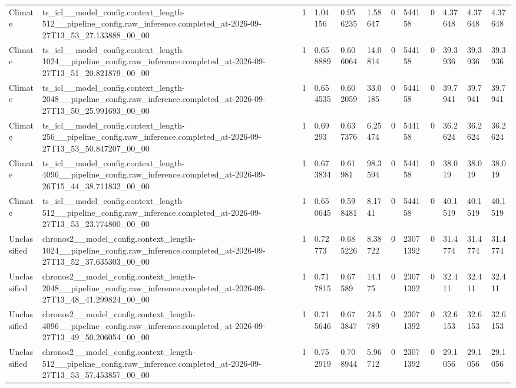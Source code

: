 \begin{tabular}{llllllllllll}
Climate & ts\_icl\_\_model\_config.context\_length-512\_\_pipeline\_config.raw\_inference.completed\_at-2026-09-27T13\_53\_27.133888\_00\_00 & 1 & 1.04156 & 0.956235 & 1.58647 & 0 & 544158 & 0 & 4.37648 & 4.37648 & 4.37648 \\
Climate & ts\_icl\_\_model\_config.context\_length-1024\_\_pipeline\_config.raw\_inference.completed\_at-2026-09-27T13\_51\_20.821879\_00\_00 & 1 & 0.658889 & 0.606064 & 14.0814 & 0 & 544158 & 0 & 39.3936 & 39.3936 & 39.3936 \\
Climate & ts\_icl\_\_model\_config.context\_length-2048\_\_pipeline\_config.raw\_inference.completed\_at-2026-09-27T13\_50\_25.991693\_00\_00 & 1 & 0.654535 & 0.602059 & 33.0185 & 0 & 544158 & 0 & 39.7941 & 39.7941 & 39.7941 \\
Climate & ts\_icl\_\_model\_config.context\_length-256\_\_pipeline\_config.raw\_inference.completed\_at-2026-09-27T13\_53\_50.847207\_00\_00 & 1 & 0.69293 & 0.637376 & 6.25474 & 0 & 544158 & 0 & 36.2624 & 36.2624 & 36.2624 \\
Climate & ts\_icl\_\_model\_config.context\_length-4096\_\_pipeline\_config.raw\_inference.completed\_at-2026-09-26T15\_44\_38.711832\_00\_00 & 1 & 0.673834 & 0.61981 & 98.3594 & 0 & 544158 & 0 & 38.019 & 38.019 & 38.019 \\
Climate & ts\_icl\_\_model\_config.context\_length-512\_\_pipeline\_config.raw\_inference.completed\_at-2026-09-27T13\_53\_23.774800\_00\_00 & 1 & 0.650645 & 0.598481 & 8.1741 & 0 & 544158 & 0 & 40.1519 & 40.1519 & 40.1519 \\
Unclassified & chronos2\_\_model\_config.context\_length-1024\_\_pipeline\_config.raw\_inference.completed\_at-2026-09-27T13\_52\_37.635303\_00\_00 & 1 & 0.72773 & 0.685226 & 8.38722 & 0 & 23071392 & 0 & 31.4774 & 31.4774 & 31.4774 \\
Unclassified & chronos2\_\_model\_config.context\_length-2048\_\_pipeline\_config.raw\_inference.completed\_at-2026-09-27T13\_48\_41.299824\_00\_00 & 1 & 0.717815 & 0.67589 & 14.175 & 0 & 23071392 & 0 & 32.411 & 32.411 & 32.411 \\
Unclassified & chronos2\_\_model\_config.context\_length-4096\_\_pipeline\_config.raw\_inference.completed\_at-2026-09-27T13\_49\_50.206054\_00\_00 & 1 & 0.715646 & 0.673847 & 24.5789 & 0 & 23071392 & 0 & 32.6153 & 32.6153 & 32.6153 \\
Unclassified & chronos2\_\_model\_config.context\_length-512\_\_pipeline\_config.raw\_inference.completed\_at-2026-09-27T13\_53\_57.453857\_00\_00 & 1 & 0.752919 & 0.708944 & 5.96712 & 0 & 23071392 & 0 & 29.1056 & 29.1056 & 29.1056 \\

\end{tabular}

